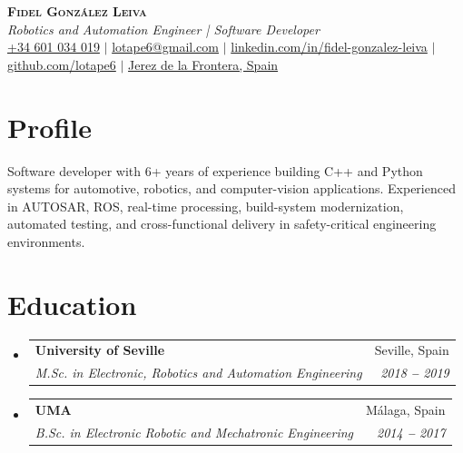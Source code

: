 \documentclass[letterpaper,11pt]{article}
\makeatletter
\newcommand{\resumeSubheading}[4]{
  \vspace{-2pt}\item
    \begin{tabular*}{0.97\textwidth}[t]{l@{\extracolsep{\fill}}r}
      \textbf{#1} & #2 \\
      \textit{\small#3} & \textit{\small #4} \\
    \end{tabular*}\vspace{-7pt}
}
\newcommand{\resumeSubHeadingListStart}{\begin{itemize}[leftmargin=0.15in, label={}]}
\newcommand{\resumeSubHeadingListEnd}{\end{itemize}}
\makeatother
\begin{document}
\begin{center}
    \textbf{\Huge \scshape Fidel Gonz\'alez Leiva} \\ \vspace{3pt}
    \small
    \textit{Robotics and Automation Engineer | Software Developer} \\ \vspace{3pt}
    \faMobile \hspace{.5pt} \href{tel:+34601034019}{+34 601 034 019}
    $|$
    \faAt \hspace{.5pt} \href{mailto:lotape6@gmail.com}{lotape6@gmail.com}
    $|$
    \faLinkedinSquare \hspace{.5pt} \href{https://www.linkedin.com/in/fidel-gonzalez-leiva/}{linkedin.com/in/fidel-gonzalez-leiva}
    $|$
    \faGithub \hspace{.5pt} \href{https://github.com/lotape6}{github.com/lotape6}
    $|$
    \faMapMarker \hspace{.5pt} \href{https://www.google.com/maps/place/Jerez+de+la+Frontera,+C\'adiz,+Spain}{Jerez de la Frontera, Spain}
\end{center}

\section{Profile}
  \vspace{2pt}
  \small{Software developer with 6+ years of experience building C++ and Python systems for automotive, robotics, and computer-vision applications. Experienced in AUTOSAR, ROS, real-time processing, build-system modernization, automated testing, and cross-functional delivery in safety-critical engineering environments.}

\section{Education}
  \vspace{2pt}
  \resumeSubHeadingListStart
    \resumeSubheading
      {University of Seville}{Seville, Spain}
      {M.Sc. in Electronic, Robotics and Automation Engineering}{2018 \textbf{--} 2019}
    \resumeSubheading
      {UMA}{M\'alaga, Spain}
      {B.Sc. in Electronic Robotic and Mechatronic Engineering}{2014 \textbf{--} 2017}
  \resumeSubHeadingListEnd
\end{document}
